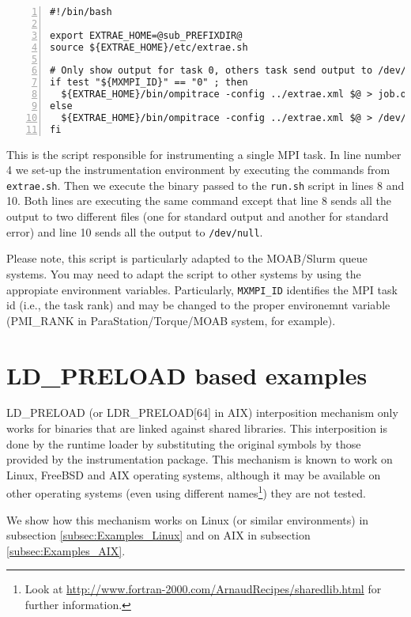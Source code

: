\begin{Verbatim}[frame=single,numbers=left,labelposition=topline,label=run.sh]
#!/bin/bash

export EXTRAE_HOME=@sub_PREFIXDIR@
source ${EXTRAE_HOME}/etc/extrae.sh

# Only show output for task 0, others task send output to /dev/null
if test "${MXMPI_ID}" == "0" ; then
  ${EXTRAE_HOME}/bin/ompitrace -config ../extrae.xml $@ > job.out 2> job.err
else
  ${EXTRAE_HOME}/bin/ompitrace -config ../extrae.xml $@ > /dev/null 2> /dev/null
fi
\end{Verbatim}

This is the script responsible for instrumenting a single MPI task. In line number 4 we set-up the instrumentation environment by executing the commands from {\tt extrae.sh}. Then we execute the binary passed to the {\tt run.sh} script in lines 8 and 10. Both lines are executing the same command except that line 8 sends all the output to two different files (one for standard output and another for standard error) and line 10 sends all the output to {\tt /dev/null}.

Please note, this script is particularly adapted to the MOAB/Slurm queue systems. You may need to adapt the script to other systems by using the appropiate environment variables. Particularly, {\tt MXMPI\_ID} identifies the MPI task id (i.e., the task rank) and may be changed to the proper environemnt variable (PMI\_RANK in ParaStation/Torque/MOAB system, for example).

\section{LD\_PRELOAD based examples}\label{sec:Examples_LDPRELOAD}

LD\_PRELOAD (or LDR\_PRELOAD[64] in AIX) interposition mechanism only works for binaries that are linked against shared libraries. This interposition is done by the runtime loader by substituting the original symbols by those provided by the instrumentation package. This mechanism is known to work on Linux, FreeBSD and AIX operating systems, although it may be available on other operating systems (even using different names\footnote{Look at \url{http://www.fortran-2000.com/ArnaudRecipes/sharedlib.html} for further information.}) they are not tested.

We show how this mechanism works on Linux (or similar environments) in subsection \ref{subsec:Examples_Linux} and on AIX in subsection \ref{subsec:Examples_AIX}.

